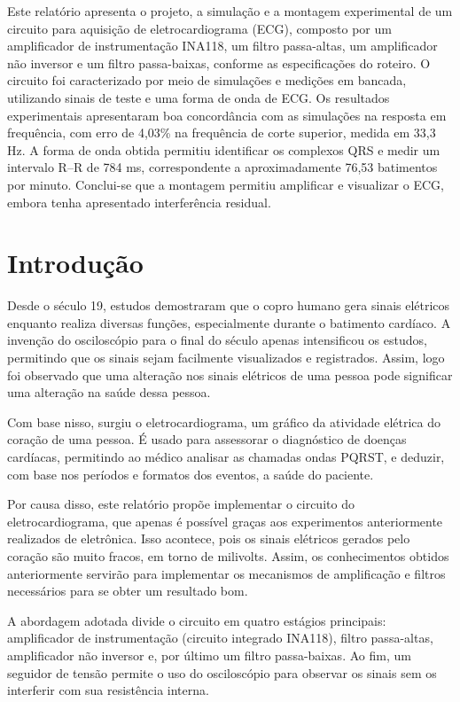 \documentclass[11pt,a4paper]{article}
\begin{document}
\capa

\begin{resumo}
Este relatório apresenta o projeto, a simulação e a montagem experimental de um circuito para aquisição de eletrocardiograma (ECG), composto por um amplificador de instrumentação INA118, um filtro passa-altas, um amplificador não inversor e um filtro passa-baixas, conforme as especificações do roteiro. O circuito foi caracterizado por meio de simulações e medições em bancada, utilizando sinais de teste e uma forma de onda de ECG. Os resultados experimentais apresentaram boa concordância com as simulações na resposta em frequência, com erro de 4,03\% na frequência de corte superior, medida em 33,3 Hz. A forma de onda obtida permitiu identificar os complexos QRS e medir um intervalo R–R de 784 ms, correspondente a aproximadamente 76,53 batimentos por minuto. Conclui-se que a montagem permitiu amplificar e visualizar o ECG, embora tenha apresentado interferência residual.
\end{resumo}

\section{Introdução}

Desde o século 19, estudos demostraram que o copro humano gera sinais elétricos enquanto realiza
diversas funções, especialmente durante o batimento cardíaco. A invenção do osciloscópio para o final
do século apenas intensificou os estudos, permitindo que os sinais sejam facilmente visualizados e
registrados. Assim, logo foi observado que uma alteração nos sinais elétricos de uma pessoa pode
significar uma alteração na saúde dessa pessoa.

Com base nisso, surgiu o eletrocardiograma, um gráfico da atividade elétrica do coração de uma pessoa.
É usado para assessorar o diagnóstico de doenças cardíacas, permitindo ao médico analisar as chamadas
ondas PQRST, e deduzir, com base nos períodos e formatos dos eventos, a saúde do paciente.

Por causa disso, este relatório propõe implementar o circuito do eletrocardiograma, que apenas é possível
graças aos experimentos anteriormente realizados de eletrônica. Isso acontece, pois os sinais elétricos
gerados pelo coração são muito fracos, em torno de milivolts. Assim, os conhecimentos obtidos anteriormente
servirão para implementar os mecanismos de amplificação e filtros necessários para se obter um resultado bom.

A abordagem adotada divide o circuito em quatro estágios principais:
amplificador de instrumentação (circuito integrado INA118), filtro passa-altas, amplificador não inversor e,
por último um filtro passa-baixas. Ao fim, um seguidor de tensão permite o uso do osciloscópio para observar
os sinais sem os interferir com sua resistência interna.
\end{document}
